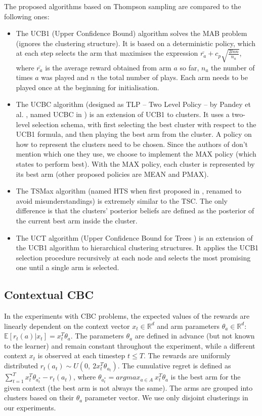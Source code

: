 The proposed algorithms based on Thompson sampling are compared to the following ones:

\begin{itemize}
  \item The UCB1 \cite{auer} (Upper Confidence Bound) algorithm solves the MAB problem (ignores the clustering structure). It is based on a deterministic policy, which at each step selects the arm that maximises the expression $\bar{r_a} + c_p \sqrt{\frac{2 ln n}{n_a}}$, where $\bar{r_a}$ is the average reward obtained from arm $a$ so far, $n_a$ the number of times $a$ was played and $n$ the total number of plays. Each arm needs to be played once at the beginning for initialisation.
  \item The UCBC algorithm (designed as TLP -- Two Level Policy -- by Pandey et al. \cite{pandey}, named UCBC in \cite{bouneffouf}) is an extension of UCB1 to clusters. It uses a two-level selection schema, with first selecting the best cluster with respect to the UCB1 formula, and then playing the best arm from the cluster. A policy on how to represent the clusters need to be chosen. Since the authors of \cite{bandits} don't mention which one they use, we choose to implement the MAX policy (which \cite{pandey} states to perform best). With the MAX policy, each cluster is represented by its best arm (other proposed policies are MEAN and PMAX).
  \item The TSMax algorithm (named HTS when first proposed in \cite{zhao}, renamed to avoid misunderstandings) is extremely similar to the TSC. The only difference is that the clusters' posterior beliefs are defined as the posterior of the current best arm inside the cluster.
  \item The UCT algorithm (Upper Confidence Bound for Trees \cite{kocsis}) is an extension of the UCB1 algorithm to hierarchical clustering structures. It applies the UCB1 selection procedure recursively at each node and selects the most promising one until a single arm is selected.
\end{itemize}

\subsection{Contextual CBC}

In the experiments with CBC problems, the expected values of the rewards are linearly dependent on the context vector $x_t \in \mathbb{R}^d$ and arm parameters $\theta_a \in \mathbb{R}^d$: $\mathbb{E}[r_t(a) | x_t] = x_t^T \theta_a$. The parameters $\theta_a$ are defined in advance (but not known to the learner) and remain constant throughout the experiment, while a different context $x_t$ is observed at each timestep $t \leq T$. The rewards are uniformly distributed $r_t(a_t) \sim U(0,\ 2 x_t^T \theta_{a_t})$. The cumulative regret is defined as $\sum_{t=1}^T x_t^T \theta_{a_t^*} - r_t(a_t)$, where $\theta_{a_t^*} = arg max_{a \in A}\ x_t^T \theta_a$ is the best arm for the given context (the best arm is not always the same). The arms are grouped into clusters based on their $\theta_a$ parameter vector. We use only disjoint clusterings in our experiments.

